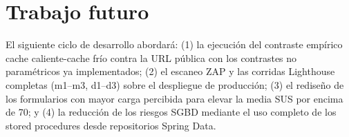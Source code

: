 \chapter{Trabajo futuro}
\label{cap:futuro}

El siguiente ciclo de desarrollo abordará: (1) la ejecución del contraste empírico
cache caliente-cache frío contra la URL pública con los contrastes no paramétricos
ya implementados; (2) el escaneo ZAP y las corridas Lighthouse completas (m1--m3,
d1--d3) sobre el despliegue de producción; (3) el rediseño de los formularios con
mayor carga percibida para elevar la media SUS por encima de 70; y (4) la reducción
de los riesgos SGBD mediante el uso completo de los stored procedures desde
repositorios Spring Data.